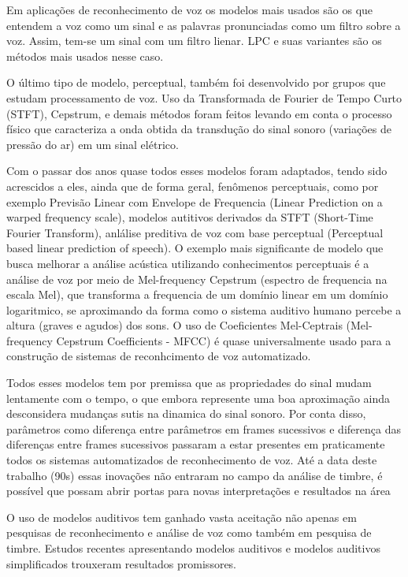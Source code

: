 Em aplicações de reconhecimento de voz os modelos mais usados são os que
entendem a voz como um sinal e as palavras pronunciadas como um filtro sobre a
voz. Assim, tem-se um sinal com um filtro lienar. LPC e suas variantes são os
métodos mais usados nesse caso.

O último tipo de modelo, perceptual, também foi desenvolvido por grupos que
estudam processamento de voz. Uso da Transformada de Fourier de Tempo Curto
(STFT), Cepstrum, e demais métodos foram feitos levando em conta o processo
físico que caracteriza a onda obtida da transdução do sinal sonoro (variações
de pressão do ar) em um sinal elétrico.

Com o passar dos anos quase todos esses modelos foram adaptados, tendo sido
acrescidos a eles, ainda que de forma geral, fenômenos perceptuais, como por
exemplo Previsão Linear com Envelope de Frequencia (Linear Prediction on a
warped frequency scale), modelos autitivos derivados da STFT (Short-Time
Fourier Transform), anlálise preditiva de voz com base perceptual (Perceptual
based linear prediction of speech). O exemplo mais significante de modelo que
busca melhorar a análise acústica utilizando conhecimentos perceptuais é a
análise de voz por meio de Mel-frequency Cepstrum (espectro de frequencia na
escala Mel), que transforma a frequencia de um domínio linear em um domínio
logaritmico, se aproximando da forma como o sistema auditivo humano percebe a
altura (graves e agudos) dos sons. O uso de Coeficientes Mel-Ceptrais
(Mel-frequency Cepstrum Coefficients - MFCC) é quase universalmente usado para
a construção de sistemas de reconhcimento de voz automatizado. 

Todos esses modelos tem por premissa que as propriedades do sinal mudam
lentamente com o tempo, o que embora represente uma boa aproximação ainda
desconsidera mudanças sutis na dinamica do sinal sonoro. Por conta disso,
parâmetros como diferença entre parâmetros em frames sucessivos e diferença
das diferenças entre frames sucessivos passaram a estar presentes em
praticamente todos os sistemas automatizados de reconhecimento de voz.
Até a data deste trabalho (90s) essas inovações não entraram no campo da
análise de timbre, é possível que possam abrir portas para novas
interpretações e resultados na área

O uso de modelos auditivos tem ganhado vasta aceitação não apenas em pesquisas
de reconhecimento e análise de voz como também em pesquisa de timbre. Estudos
recentes apresentando modelos auditivos e modelos auditivos simplificados
trouxeram resultados promissores.

